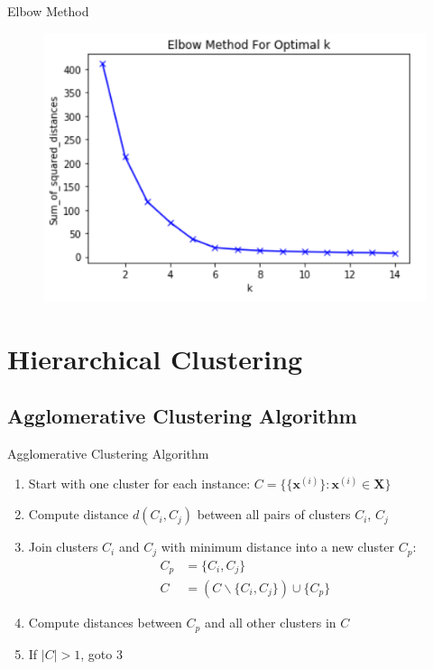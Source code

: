\begin{frame}{Elbow Method}{}
	\begin{figure}
		\centering
		\includegraphics[scale=0.6]{12_clustering/02_img/elbow}
	\end{figure}
\end{frame}


\section{Hierarchical Clustering}

\subsection{Agglomerative Clustering Algorithm}

\begin{frame}{Agglomerative Clustering Algorithm}{}\important
	\begin{enumerate}
		\item Start with one cluster for each instance: $C = \{ \{ \bm{x}^{(i)}\} : \bm{x}^{(i)} \in \bm{X} \}$
		\item Compute distance $d(C_i, C_j)$ between all pairs of clusters $C_i$, $C_j$
		\item Join clusters $C_i$ and $C_j$ with minimum distance into a new cluster $C_p$:
		\begin{align*}
			C_p
				&= \{ C_i, C_j \} \\
			C
				&= (C \backslash \{ C_i, C_j \}) \cup \{ C_p \}
		\end{align*}
		\item Compute distances between $C_p$ and all other clusters in $C$
		\item If $\vert C \vert > 1$, goto 3
	\end{enumerate}
\end{frame}


